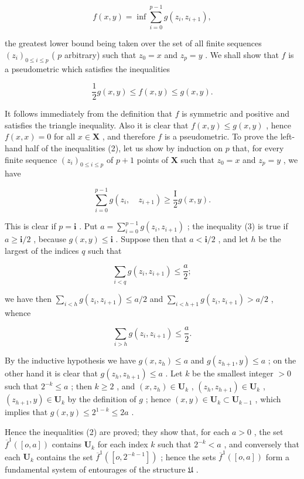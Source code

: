 \[
f (x, y) = \inf \sum_ {i = 0} ^ {p - 1} g \left(z _ {i}, z _ {i + 1}\right),
\]

the greatest lower bound being taken over the set of all finite sequences \((z_{i})_{0\leqslant i\leqslant p}\) ( \(p\) arbitrary) such that \(z_0 = x\) and \(z_{p} = y\) . We shall show that \(f\) is a pseudometric which satisfies the inequalities

\[
\frac {1}{2} g (x, y) \leqslant f (x, y) \leqslant g (x, y).\tag{2}
\]

It follows immediately from the definition that \(f\) is symmetric and positive and satisfies the triangle inequality. Also it is clear that \(f(x, y) \leqslant g(x, y)\) , hence \(f(x, x) = 0\) for all \(x \in \mathbf{X}\) , and therefore \(f\) is a pseudometric. To prove the left-hand half of the inequalities (2), let us show by induction on \(p\) that, for every finite sequence \((z_i)_{0 \leqslant i \leqslant p}\) of \(p + 1\) points of \(\mathbf{X}\) such that \(z_0 = x\) and \(z_p = y\) , we have

\[
\sum_ {i = 0} ^ {p - 1} g (z _ {i}, \quad z _ {i + 1}) \geqslant \frac {\mathrm{I}}{2} g (x, y).\tag{3}
\]

This is clear if \(p = \mathbf{i}\) . Put \(a = \sum_{i=0}^{p-1} g(z_i, z_{i+1})\) ; the inequality (3) is true if \(a \geqslant \mathbf{i}/2\) , because \(g(x, y) \leqslant \mathbf{i}\) . Suppose then that \(a < \mathbf{i}/2\) , and let \(h\) be the largest of the indices \(q\) such that

\[
\sum_ {i <   q} g (z _ {i}, z _ {i + 1}) \leqslant \frac {a}{2};
\]

we have then \(\sum_{i < h} g(z_i, z_{i+1}) \leqslant a/2\) and \(\sum_{i < h+1} g(z_i, z_{i+1}) > a/2\) , whence

\[
\sum_ {i > h} g (z _ {i}, z _ {i + 1}) \leqslant \frac {a}{2}.
\]

By the inductive hypothesis we have \(g(x, z_h) \leqslant a\) and \(g(z_{h+1}, y) \leqslant a\) ; on the other hand it is clear that \(g(z_h, z_{h+1}) \leqslant a\) . Let \(k\) be the smallest integer \(> 0\) such that \(2^{-k} \leqslant a\) ; then \(k \geqslant 2\) , and \((x, z_h) \in \mathbf{U}_k\) , \((z_h, z_{h+1}) \in \mathbf{U}_k\) , \((z_{h+1}, y) \in \mathbf{U}_k\) by the definition of \(g\) ; hence \((x, y) \in \mathbf{U}_k \subset \mathbf{U}_{k-1}\) , which implies that \(g(x, y) \leqslant 2^{1-k} \leqslant 2a\) .

Hence the inequalities (2) are proved; they show that, for each \(a > 0\) , the set \(\overline{f}^{1}([o, a])\) contains \(\mathbf{U}_{k}\) for each index \(k\) such that \(2^{-k} < a\) , and conversely that each \(\mathbf{U}_{k}\) contains the set \(\overline{f}^{1}([o, 2^{-k-1}])\) ; hence the sets \(\overline{f}^{1}([o, a])\) form a fundamental system of entourages of the structure \(\mathfrak{U}\) .

